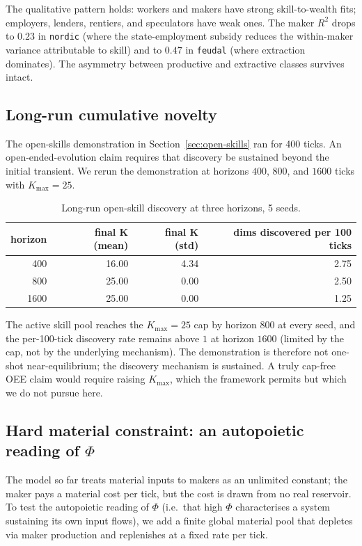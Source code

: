 \documentclass[11pt]{article}
\begin{document}
The qualitative pattern holds: workers and makers have strong
skill-to-wealth fits; employers, lenders, rentiers, and
speculators have weak ones.  The maker $R^2$ drops to $0.23$ in
\texttt{nordic} (where the state-employment subsidy reduces the
within-maker variance attributable to skill) and to $0.47$ in
\texttt{feudal} (where extraction dominates).  The asymmetry
between productive and extractive classes survives intact.

\subsection{Long-run cumulative novelty}
\label{sec:longrun-novelty}

The open-skills demonstration in Section~\ref{sec:open-skills}
ran for 400 ticks.  An open-ended-evolution claim requires that
discovery be sustained beyond the initial transient.  We rerun the
demonstration at horizons $400$, $800$, and $1600$ ticks with
$K_\text{max} = 25$.

\begin{table}[h]
\centering
\small
\caption{Long-run open-skill discovery at three horizons, 5 seeds.}
\label{tab:longrun-novelty}
\begin{tabular}{rrrr}
\toprule
horizon & final K (mean) & final K (std) & dims discovered per 100 ticks \\
\midrule
400  & 16.00 & 4.34 & 2.75 \\
800  & 25.00 & 0.00 & 2.50 \\
1600 & 25.00 & 0.00 & 1.25 \\
\bottomrule
\end{tabular}
\end{table}

The active skill pool reaches the $K_\text{max} = 25$ cap by
horizon $800$ at every seed, and the per-100-tick discovery rate
remains above $1$ at horizon $1600$ (limited by the cap, not by
the underlying mechanism).  The demonstration is therefore not
one-shot near-equilibrium; the discovery mechanism is sustained.
A truly cap-free OEE claim would require raising $K_\text{max}$,
which the framework permits but which we do not pursue here.

\subsection{Hard material constraint: an autopoietic reading of $\Phi$}
\label{sec:material}

The model so far treats material inputs to makers as an unlimited
constant; the maker pays a material cost per tick, but the cost
is drawn from no real reservoir.  To test the autopoietic reading
of $\Phi$ (i.e.\ that high $\Phi$ characterises a system
sustaining its own input flows), we add a finite global material
pool that depletes via maker production and replenishes at a
fixed rate per tick.
\end{document}
